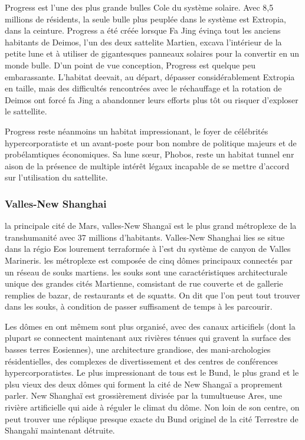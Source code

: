                                                                Progress est l'une des plus grande bulles Cole du système solaire. Avec 8,5 millions de résidents, la seule bulle plus peuplée dans le système est Extropia, dans la ceinture. Progress a été créée lorsque Fa Jing évinça tout les anciens habitants de Deimos, l'un des deux sattelite Martien, excava l'intérieur de la petite lune et à utiliser de gigantesques panneaux solaires pour la convertir en un monde bulle. D'un point de vue conception, Progress est quelque peu embarassante. L'habitat deevait, au départ, dépasser considérablement Extropia en taille, mais des difficultés rencontrées avec le réchauffage et la rotation de Deimos ont forcé fa Jing a abandonner leurs efforts plus tôt ou risquer d'exploser le sattellite. 

                                                               Progress reste néanmoins un habitat impressionant, le foyer de célébrités hypercorporatiste et un avant-poste pour bon nombre de politique majeurs et de probélamtiques économiques. Sa lune sœur, Phobos, reste un habitat tunnel enr aison de la présence de multiple intérêt légaux incapable de se mettre d'accord sur l'utilisation du sattellite. 

                                                               \subsubsection{Valles-New Shanghai} \label{sec:valles-new-shanghai} 

                                                               la principale cité de Mars, valles-New Shangaï est le plus grand métroplexe de la transhumanité avec 37 millions d'habitants. Valles-New Shanghai lies se situe dans la régio Eos lourement terraformée à l'est du système de canyon de Valles Marineris. les métroplexe est composée de cinq dômes principaux connectés par un réseau de souks martiens. les souks sont une caractéristiques architecturale unique des grandes cités Martienne, comsistant de rue couverte et de gallerie remplies de bazar, de restaurants et de squatts. On dit que l'on peut tout trouver dans les souks, à condition de passer suffisament de temps à les parcourir. 

                                                               Les dômes en ont mêmem sont plus organisé, avec des canaux articifiels (dont la plupart se connectent maintenant aux rivières ténues qui gravent la surface des basses terres Eosiennes), une architecture grandiose, des mani-archologies résidentielles, des complexes de divertissement et des centres de conférences hypercorporatistes. Le plus impressionant de tous est le Bund, le plus grand et le plsu vieux des deux dômes qui forment la cité de New Shangaï a proprement parler. New Shanghaï est grossièrement divisée par la tumultueuse Ares, une rivière artificielle qui aide à réguler le climat du dôme. Non loin de son centre, on peut trouver une réplique presque exacte du Bund originel de la cité Terrestre de Shangahï maintenant détruite. 

